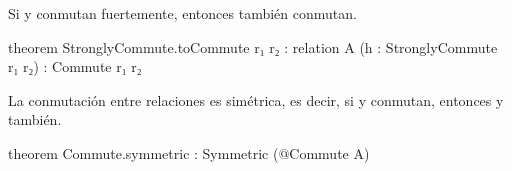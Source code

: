 \begin{thm}
Si  y  conmutan fuertemente, entonces también conmutan.
\begin{leancode}
theorem StronglyCommute.toCommute {r₁ r₂ : relation A} (h : StronglyCommute r₁ r₂) : 
  Commute r₁ r₂ 
\end{leancode}
\end{thm}

\begin{thm}
La conmutación entre relaciones es simétrica, es decir, 
si  y  conmutan, 
entonces  y  también.
\begin{leancode}
theorem Commute.symmetric : Symmetric (@Commute A)
\end{leancode}
\end{thm}


